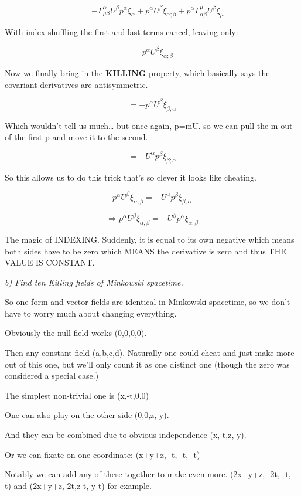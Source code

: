 \documentclass[landscape,letterpaper,10pt,english]{article}
\begin{document}
\[ = - \Gamma^\alpha_{\mu\beta} U^\beta p^\alpha \xi_\alpha + p^\alpha  U^\beta \xi_{\alpha;\beta} + p^\alpha \Gamma^\mu_{\alpha\beta} U^\beta \xi_\mu \]

With index shuffling the first and last terms cancel, leaving only:

\[ =  p^\alpha  U^\beta \xi_{\alpha;\beta} \]

Now we finally bring in the \textbf{KILLING} property, which basically
says the covariant derivatives are antisymmetric.

\[ = - p^\alpha  U^\beta \xi_{\beta;\alpha} \]

Which wouldn't tell us much\ldots{} but once again, p=mU. so we can pull
the m out of the first p and move it to the second.

\[ = - U^\alpha  p^\beta \xi_{\beta;\alpha} \]

So this allows us to do this trick that's so clever it looks like
cheating.

\[ p^\alpha  U^\beta \xi_{\alpha;\beta} = - U^\alpha  p^\beta \xi_{\beta;\alpha} \]

\[ \Rightarrow p^\alpha  U^\beta \xi_{\alpha;\beta} = - U^\beta  p^\alpha \xi_{\alpha;\beta} \]

The magic of INDEXING. Suddenly, it is equal to its own negative which
means both sides have to be zero which MEANS the derivative is zero and
thus THE VALUE IS CONSTANT.

    \emph{b) Find ten Killing fields of Minkowski spacetime.}

    So one-form and vector fields are identical in Minkowski spacetime, so
we don't have to worry much about changing everything.

Obviously the null field works (0,0,0,0).

Then any constant field (a,b,c,d). Naturally one could cheat and just
make more out of this one, but we'll only count it as one distinct one
(though the zero was considered a special case.)

The simplest non-trivial one is (x,-t,0,0)

One can also play on the other side (0,0,z,-y).

And they can be combined due to obvious independence (x,-t,z,-y).

Or we can fixate on one coordinate: (x+y+z, -t, -t, -t)

Notably we can add any of these together to make even more. (2x+y+z,
-2t, -t, -t) and (2x+y+z,-2t,z-t,-y-t) for example.
\end{document}
